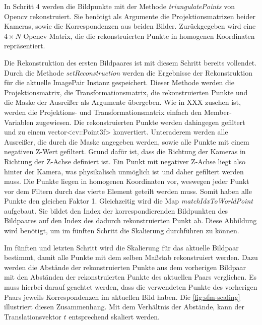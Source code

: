 In Schritt 4 werden die Bildpunkte mit der Methode \emph{triangulatePoints} von Opencv rekonstruiert.
Sie benötigt als Argumente die Projektionsmatrizen beider Kameras, sowie die Korrespondenzen aus beiden Bilder.  
Zurückgegeben wird eine $4\times N$ Opencv Matrix, die die rekonstruierten Punkte in homogenen Koordinaten repräsentiert.

Die Rekonstruktion des ersten Bildpaares ist mit diesem Schritt bereits vollendet.
Durch die Methode \emph{setReconstruction} werden die Ergebnisse der Rekonstruktion für die aktuelle ImagePair Instanz gespeichert.
Dieser Methode werden die Projektionsmatrix, die Transformationsmatrix, die rekonstruierten Punkte und die Maske der Ausreißer als Argumente übergeben. 
Wie in XXX zusehen ist, werden die Projektions- und Transformationsmatrix einfach den Member-Variablen zugewiesen.
Die rekonstruierten Punkte werden dahingegen gefiltert und zu einem vector<cv::Point3f> konvertiert.
Unteraderem werden alle Ausreißer, die durch die Maske angegeben werden, sowie alle Punkte mit einem negativen Z-Wert gefiltert.
Grund dafür ist, dass die Richtung der Kameras in Richtung der Z-Achse definiert ist.
Ein Punkt mit negativer Z-Achse liegt also hinter der Kamera, was physikalisch unmöglich ist und daher gefiltert werden muss.
Die Punkte liegen in homogenen Koordinaten vor, weswegen jeder Punkt vor dem Filtern durch das vierte Element geteilt werden muss.
Somit haben alle Punkte den gleichen Faktor 1.
Gleichzeitig wird die Map \emph{matchIdxToWorldPoint} aufgebaut.
Sie bildet den Index der korrespondierenden Bildpunkten des Bildpaares auf den Index des dadurch rekonstruierten Punkt ab.
Diese Abbildung wird benötigt, um im fünften Schritt die Skalierung durchführen zu können.

Im fünften und letzten Schritt wird die Skalierung für das aktuelle Bildpaar bestimmt, damit alle Punkte mit dem selben Maßstab rekonstruiert werden.  
Dazu werden die Abstände der rekonstruierten Punkte aus dem vorherigen Bildpaar mit den Abständen der rekonstruierten Punkte des aktuellen Paars verglichen.
Es muss hierbei darauf geachtet werden, dass die verwendeten Punkte des vorherigen Paars jeweils Korrespondenzen im aktuellen Bild haben.
Die \cref{fig:sfm-scaling} illustriert diesen Zusammenhang.
Mit dem Verhältnis der Abstände, kann der Translationsvektor $t$ entsprechend skaliert werden.


